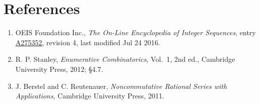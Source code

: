 \documentclass[11pt]{article}
\theoremstyle{definition}
\begin{document}
\section{References}

\begin{enumerate}

\item OEIS Foundation Inc., \emph{The On-Line Encyclopedia of Integer Sequences}, entry \href{https://oeis.org/A275352}{A275352}, revision 4, last modified Jul 24 2016.

\item R. P. Stanley, \emph{Enumerative Combinatorics}, Vol.~1, 2nd ed., Cambridge University Press, 2012; \S4.7.

\item J. Berstel and C. Reutenauer, \emph{Noncommutative Rational Series with Applications}, Cambridge University Press, 2011.

\end{enumerate}
\end{document}
